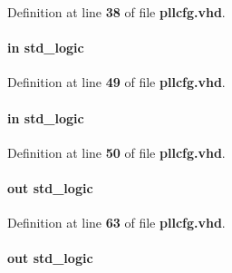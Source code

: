 Definition at line {\bf 38} of file {\bf pllcfg.\+vhd}.

\paragraph[{phcfg\+\_\+done}]{ {\bfseries \textcolor{keywordflow}{in}\textcolor{vhdlchar}{ }} {\bfseries \textcolor{comment}{std\+\_\+logic}\textcolor{vhdlchar}{ }} \hspace{0.3cm}{\ttfamily [Port]}}\label{classpllcfg_aa021db014eadd2ef88db59bbb14a7be7}


Definition at line {\bf 49} of file {\bf pllcfg.\+vhd}.

\paragraph[{phcfg\+\_\+error}]{ {\bfseries \textcolor{keywordflow}{in}\textcolor{vhdlchar}{ }} {\bfseries \textcolor{comment}{std\+\_\+logic}\textcolor{vhdlchar}{ }} \hspace{0.3cm}{\ttfamily [Port]}}\label{classpllcfg_a4616d69ba1fac8b84088065f2e9e29e0}


Definition at line {\bf 50} of file {\bf pllcfg.\+vhd}.

\paragraph[{phcfg\+\_\+mode}]{ {\bfseries \textcolor{keywordflow}{out}\textcolor{vhdlchar}{ }} {\bfseries \textcolor{comment}{std\+\_\+logic}\textcolor{vhdlchar}{ }} \hspace{0.3cm}{\ttfamily [Port]}}\label{classpllcfg_afd7b55f414ed28c4644690c3fdcc37cc}


Definition at line {\bf 63} of file {\bf pllcfg.\+vhd}.

\paragraph[{phcfg\+\_\+start}]{ {\bfseries \textcolor{keywordflow}{out}\textcolor{vhdlchar}{ }} {\bfseries \textcolor{comment}{std\+\_\+logic}\textcolor{vhdlchar}{ }} \hspace{0.3cm}{\ttfamily [Port]}}\label{classpllcfg_a7ee5dc275b4fefeee39a8b4bdff8a06a}


